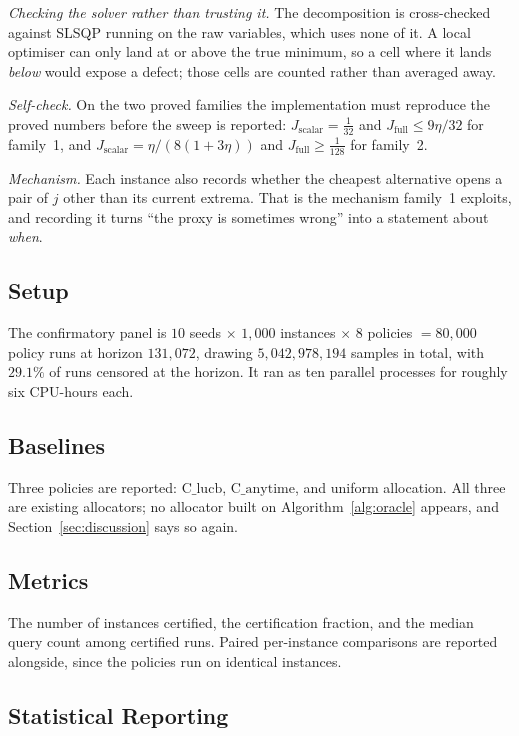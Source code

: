 \emph{Checking the solver rather than trusting it.} The decomposition is cross-checked
against SLSQP running on the raw variables, which uses none of it. A local optimiser can only
land at or above the true minimum, so a cell where it lands \emph{below} would expose a
defect; those cells are counted rather than averaged away.

\emph{Self-check.} On the two proved families the implementation must reproduce the proved
numbers before the sweep is reported: $J_{\mathrm{scalar}}=\tfrac1{32}$ and
$J_{\mathrm{full}}\le 9\eta/32$ for family~1, and
$J_{\mathrm{scalar}}=\eta/(8(1+3\eta))$ and $J_{\mathrm{full}}\ge\tfrac1{128}$ for family~2.

\emph{Mechanism.} Each instance also records whether the cheapest alternative opens a pair of
$j$ other than its current extrema. That is the mechanism family~1 exploits, and recording it
turns ``the proxy is sometimes wrong'' into a statement about \emph{when}.

\subsection{Setup}

The confirmatory panel is $10$ seeds $\times$ $1{,}000$ instances $\times$ $8$ policies
$=80{,}000$ policy runs at horizon $131{,}072$, drawing $5{,}042{,}978{,}194$ samples in
total, with $29.1\%$ of runs censored at the horizon. It ran as ten parallel processes for
roughly six CPU-hours each.

\subsection{Baselines}

Three policies are reported: $\mathrm{C\_lucb}$, $\mathrm{C\_anytime}$, and uniform
allocation. All three are existing allocators; no allocator built on
Algorithm~\ref{alg:oracle} appears, and Section~\ref{sec:discussion} says so again.

\subsection{Metrics}

The number of instances certified, the certification fraction, and the median query count
among certified runs. Paired per-instance comparisons are reported alongside, since the
policies run on identical instances.

\subsection{Statistical Reporting}


